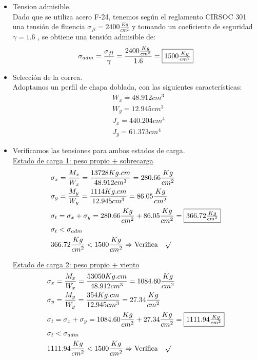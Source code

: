 \begin{itemize}
\item Tension admisible.\\
Dado que se utiliza acero F-24, tenemos según el reglamento CIRSOC 301 una tensión de fluencia $\sigma_{fl}=2400 \frac{Kg}{cm^2}$ y tomando un coeficiente de seguridad $\gamma = 1.6$ , se obtiene una tensión admisible de:
$$\sigma_{adm}= \frac{\sigma_{fl}}{\gamma} = \frac{2400 \frac{Kg}{cm^2}}{1.6} = \framebox{$1500 \frac{Kg}{cm^2}$}$$

\newpage
\item Selección de la correa.\\
Adoptamos un perfil  de chapa doblada, con las siguientes características:
\begin{align*}
& W_x= 48.912 cm^3 \\
& W_y= 12.945 cm^3 \\
& J_x= 440.204 cm^4 \\
& J_y= 61.373 cm^4
\end{align*}

\item Verificamos las tensiones para ambos estados de carga.\\
\underline{Estado de carga 1: peso propio + sobrecarga}
\begin{align*}
& \sigma_x=\frac{M_x}{W_x} = \frac{13728 Kg.cm}{48.912 cm^3} = 280.66 \frac{Kg}{cm^2}\\
& \sigma_y=\frac{M_y}{W_y} = \frac{1114 Kg.cm}{12.945 cm^3} = 86.05 \frac{Kg}{cm^2}\\
& \sigma_t= \sigma_x + \sigma_y = 280.66 \frac{Kg}{cm^2} + 86.05 \frac{Kg}{cm^2} = \framebox{$366.72 \frac{Kg}{cm^2}$}\\
& \sigma_t < \sigma_{adm}\\
& 366.72 \frac{Kg}{cm^2} < 1500 \frac{Kg}{cm^2} \Rightarrow \text{Verifica} \quad \surd
\end{align*}

\underline{Estado de carga 2: peso propio + viento}
\begin{align*}
& \sigma_x=\frac{M_x}{W_x} = \frac{53050 Kg.cm}{48.912 cm^3} = 1084.60 \frac{Kg}{cm^2}\\
& \sigma_y=\frac{M_y}{W_y} = \frac{354 Kg.cm}{12.945 cm^3} = 27.34 \frac{Kg}{cm^2}\\
& \sigma_t= \sigma_x + \sigma_y = 1084.60 \frac{Kg}{cm^2} + 27.34 \frac{Kg}{cm^2} = \framebox{$1111.94 \frac{Kg}{cm^2}$}\\
& \sigma_t < \sigma_{adm}\\
& 1111.94 \frac{Kg}{cm^2} < 1500 \frac{Kg}{cm^2} \Rightarrow \text{Verifica} \quad \surd
\end{align*}


\end{itemize}
